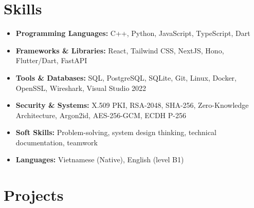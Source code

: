 \documentclass[10pt,a4paper]{article}
\begin{document}
\section*{Skills}
\begin{itemize}[leftmargin=0.15in, label={}, itemsep=0pt]
    \item \textbf{Programming Languages:} C++, Python, JavaScript, TypeScript, Dart
    \item \textbf{Frameworks \& Libraries:} React, Tailwind CSS, NextJS, Hono, Flutter/Dart, FastAPI
    \item \textbf{Tools \& Databases:} SQL, PostgreSQL, SQLite, Git, Linux, Docker, OpenSSL, Wireshark, Visual Studio 2022
    \item \textbf{Security \& Systems:} X.509 PKI, RSA-2048, SHA-256, Zero-Knowledge Architecture, Argon2id, AES-256-GCM, ECDH P-256
    \item \textbf{Soft Skills:} Problem-solving, system design thinking, technical documentation, teamwork
    \item \textbf{Languages:} Vietnamese (Native), English (level B1)
\end{itemize}

\section*{Projects}
\end{document}
